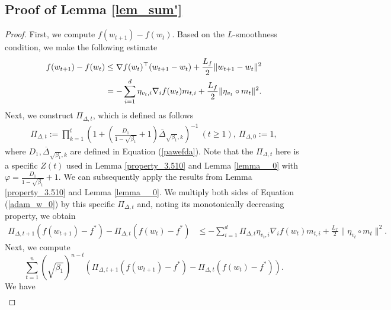 \documentclass{article} %
\begin{document}
\subsection{Proof of Lemma \ref{lem_sum'}}
\begin{proof}
First, we compute \( f(w_{t+1}) - f(w_{t}) \). Based on the \(L\)-smoothness condition, we make the following estimate
\begin{align}\label{adam_w_0}
f(w_{t+1})-f(w_{t})&\le \nabla f(w_{t})^{\top}(w_{t+1}-w_{t})+\frac{L_{f}}{2}\|w_{t+1}-w_{t}\|^{2} \notag \\&=-\sum_{i=1}^{d}\eta_{v_{t},i}\nabla_{i}f(w_{t})m_{t,i}+\frac{L_{f}}{2}\|\eta_{v_{t}}\circ m_{t}\|^{2}.
\end{align}  
Next, we construct \(\Pi_{\Delta,t}\), which is defined as follows
\begin{align*}
\Pi_{\Delta,t}:=\prod_{k=1}^{t}\left(1+\left(\frac{D_1}{1-\sqrt{\beta_{1}}}+1\right)\overline{\Delta}_{\sqrt{\beta_{1}},k}\right)^{-1}\ (t\ge 1),\ \Pi_{\Delta,0}:=1,
\end{align*}
where $D_{1}, \overline{\Delta}_{\sqrt{\beta_{1}},k}$ are defined in Equation (\ref{pawefda}). Note that the \(\Pi_{\Delta,t}\) here is a specific \(Z(t)\) used in Lemma \ref{property_3.510} and Lemma \ref{lemma__0} with \(\varphi = \frac{D_1}{1 - \sqrt{\beta_{1}}} + 1\). We can subsequently apply the results from Lemma \ref{property_3.510} and Lemma \ref{lemma__0}.
We multiply both sides of Equation (\ref{adam_w_0}) by this specific \(\Pi_{\Delta,t}\) and, noting its monotonically decreasing property, we obtain
\begin{align*}
\Pi_{\Delta,t+1}(f(w_{t+1})-f^*)-\Pi_{\Delta,t}(f(w_{t}) -f^*)&\le -\sum_{i=1}^{d}\Pi_{\Delta,t}\eta_{v_{t},i}\nabla_{i}f(w_{t})m_{t,i}+\frac{L_{f}}{2}\|\eta_{v_{t}}\circ m_{t}\|^{2}.
\end{align*}
Next, we compute
\[\sum_{t=1}^{n} (\sqrt{\beta_{1}})^{n-t} \left(\Pi_{\Delta,t+1}(f(w_{t+1}) - f^*) - \Pi_{\Delta,t}(f(w_{t}) - f^*)\right).\]
We have
\begin{align}\label{adam_w_1}

\end{align}
\end{proof}
\end{document}
